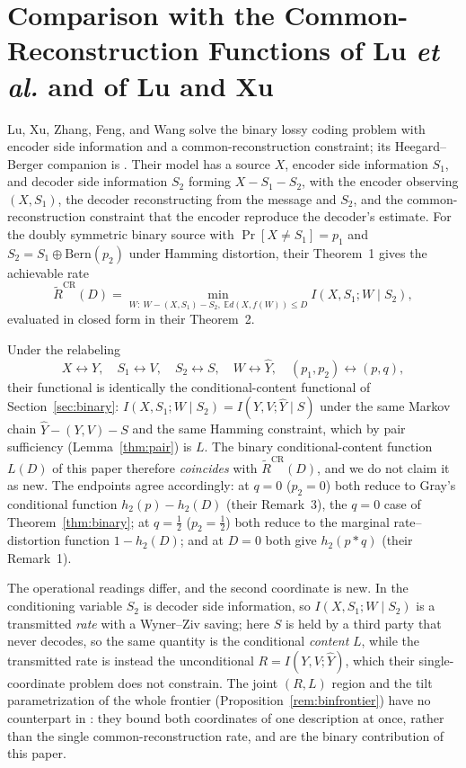 \documentclass[11pt,onecolumn]{IEEEtran}
\newcommand{\E}{\mathbb{E}}
\newcommand{\hY}{\widehat{Y}}
\begin{document}
\section{Comparison with the Common-Reconstruction Functions of Lu \emph{et al.} and of Lu and Xu}
\label{app:lucompare}

Lu, Xu, Zhang, Feng, and Wang \cite{lu2016lossy} solve the binary lossy coding
problem with encoder side information and a common-reconstruction constraint;
its Heegard--Berger companion is \cite{lu2016binary}. Their model has a source
$X$, encoder side information $S_1$, and decoder side information $S_2$ forming
$X-S_1-S_2$, with the encoder observing $(X,S_1)$, the decoder reconstructing
from the message and $S_2$, and the common-reconstruction constraint that the
encoder reproduce the decoder's estimate. For the doubly symmetric binary source
with $\Pr[X\ne S_1]=p_1$ and $S_2=S_1\oplus\mathrm{Bern}(p_2)$ under Hamming
distortion, their Theorem~1 gives the achievable rate
\[
  \widetilde R^{\mathrm{CR}}(D)
  =\min_{W:\ W-(X,S_1)-S_2,\ \E d(X,f(W))\le D} I(X,S_1;W\mid S_2),
\]
evaluated in closed form in their Theorem~2.

Under the relabeling
\[
  X\leftrightarrow Y,\quad S_1\leftrightarrow V,\quad S_2\leftrightarrow S,\quad
  W\leftrightarrow\hY,\quad (p_1,p_2)\leftrightarrow(p,q),
\]
their functional is identically the conditional-content functional of
Section~\ref{sec:binary}: $I(X,S_1;W\mid S_2)=I(Y,V;\hY\mid S)$ under the same
Markov chain $\hY-(Y,V)-S$ and the same Hamming constraint, which by pair
sufficiency (Lemma~\ref{thm:pair}) is $L$. The binary conditional-content
function $L(D)$ of this paper therefore \emph{coincides} with
$\widetilde R^{\mathrm{CR}}(D)$, and we do not claim it as new. The endpoints
agree accordingly: at $q=0$ ($p_2=0$) both reduce to Gray's conditional function
$h_2(p)-h_2(D)$ (their Remark~3), the $q=0$ case of Theorem~\ref{thm:binary}; at
$q=\tfrac12$ ($p_2=\tfrac12$) both reduce to the marginal rate--distortion
function $1-h_2(D)$; and at $D=0$ both give $h_2(p*q)$ (their Remark~1).

The operational readings differ, and the second coordinate is new. In
\cite{lu2016lossy} the conditioning variable $S_2$ is decoder side information,
so $I(X,S_1;W\mid S_2)$ is a transmitted \emph{rate} with a Wyner--Ziv saving;
here $S$ is held by a third party that never decodes, so the same quantity is
the conditional \emph{content} $L$, while the transmitted rate is instead the
unconditional $R=I(Y,V;\hY)$, which their single-coordinate problem does not
constrain. The joint $(R,L)$ region and the tilt parametrization of the
whole frontier (Proposition~\ref{rem:binfrontier}) have no counterpart in
\cite{lu2016lossy}: they bound both coordinates of one description at
once, rather than the single common-reconstruction rate, and are the
binary contribution of this paper.
\end{document}
